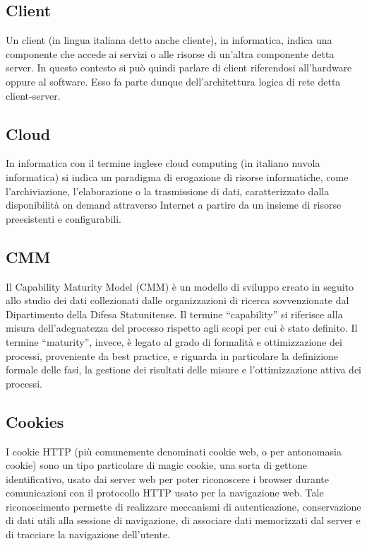 \subsection{Client}
Un client (in lingua italiana detto anche cliente), in informatica, indica una componente che accede ai servizi o alle risorse di un'altra componente detta server. In questo contesto si può quindi parlare di client riferendosi all'hardware oppure al software. Esso fa parte dunque dell'architettura logica di rete detta client-server.

\subsection{Cloud}
In informatica con il termine inglese cloud computing (in italiano nuvola informatica) si indica un paradigma di erogazione di risorse informatiche, come l'archiviazione, l'elaborazione o la trasmissione di dati, caratterizzato dalla disponibilità on demand attraverso Internet a partire da un insieme di risorse preesistenti e configurabili.

\subsection{CMM}
Il Capability Maturity Model (CMM) è un modello di sviluppo creato in seguito allo
studio dei dati collezionati dalle organizzazioni di ricerca sovvenzionate dal Dipartimento
della Difesa Statunitense. Il termine “capability” si riferisce alla misura dell’adeguatezza
del processo rispetto agli scopi per cui è stato definito. Il termine “maturity”, invece, è
legato al grado di formalità e ottimizzazione dei processi, proveniente da best practice, e
riguarda in particolare la definizione formale delle fasi, la gestione dei risultati delle misure
e l’ottimizzazione attiva dei processi.

\subsection{Cookies}
I cookie HTTP (più comunemente denominati cookie web, o per antonomasia cookie) sono un tipo particolare di magic cookie, una sorta di gettone identificativo, usato dai server web per poter riconoscere i browser durante comunicazioni con il protocollo HTTP usato per la navigazione web. Tale riconoscimento permette di realizzare meccanismi di autenticazione, conservazione di dati utili alla sessione di navigazione, di associare dati memorizzati dal server e di tracciare la navigazione dell'utente.

